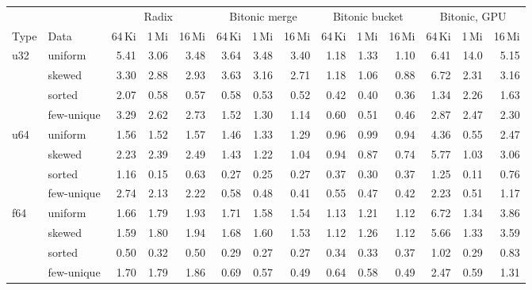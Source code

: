 \begin{tabular}{llrrrrrrrrrrrr}
\toprule
 & & \multicolumn{3}{c}{Radix} & \multicolumn{3}{c}{Bitonic merge} & \multicolumn{3}{c}{Bitonic bucket} & \multicolumn{3}{c}{Bitonic, GPU}\\
\cmidrule(lr){3-5} \cmidrule(lr){6-8} \cmidrule(lr){9-11} \cmidrule(lr){12-14}
Type & Data & 64\,Ki & 1\,Mi & 16\,Mi & 64\,Ki & 1\,Mi & 16\,Mi & 64\,Ki & 1\,Mi & 16\,Mi & 64\,Ki & 1\,Mi & 16\,Mi\\
\midrule
u32 & uniform & 5.41 & 3.06 & 3.48 & 3.64 & 3.48 & 3.40 & 1.18 & 1.33 & 1.10 & 6.41 & 14.0 & 5.15\\
 & skewed & 3.30 & 2.88 & 2.93 & 3.63 & 3.16 & 2.71 & 1.18 & 1.06 & 0.88 & 6.72 & 2.31 & 3.16\\
 & sorted & 2.07 & 0.58 & 0.57 & 0.58 & 0.53 & 0.52 & 0.42 & 0.40 & 0.36 & 1.34 & 2.26 & 1.63\\
 & few-unique & 3.29 & 2.62 & 2.73 & 1.52 & 1.30 & 1.14 & 0.60 & 0.51 & 0.46 & 2.87 & 2.47 & 2.30\\
\midrule
u64 & uniform & 1.56 & 1.52 & 1.57 & 1.46 & 1.33 & 1.29 & 0.96 & 0.99 & 0.94 & 4.36 & 0.55 & 2.47\\
 & skewed & 2.23 & 2.39 & 2.49 & 1.43 & 1.22 & 1.04 & 0.94 & 0.87 & 0.74 & 5.77 & 1.03 & 3.06\\
 & sorted & 1.16 & 0.15 & 0.63 & 0.27 & 0.25 & 0.27 & 0.37 & 0.30 & 0.37 & 1.25 & 0.11 & 0.76\\
 & few-unique & 2.74 & 2.13 & 2.22 & 0.58 & 0.48 & 0.41 & 0.55 & 0.47 & 0.42 & 2.23 & 0.51 & 1.17\\
\midrule
f64 & uniform & 1.66 & 1.79 & 1.93 & 1.71 & 1.58 & 1.54 & 1.13 & 1.21 & 1.12 & 6.72 & 1.34 & 3.86\\
 & skewed & 1.59 & 1.80 & 1.94 & 1.68 & 1.60 & 1.53 & 1.12 & 1.26 & 1.12 & 5.66 & 1.33 & 3.59\\
 & sorted & 0.50 & 0.32 & 0.50 & 0.29 & 0.27 & 0.27 & 0.34 & 0.33 & 0.37 & 1.02 & 0.29 & 0.83\\
 & few-unique & 1.70 & 1.79 & 1.86 & 0.69 & 0.57 & 0.49 & 0.64 & 0.58 & 0.49 & 2.47 & 0.59 & 1.31\\
\bottomrule
\end{tabular}
